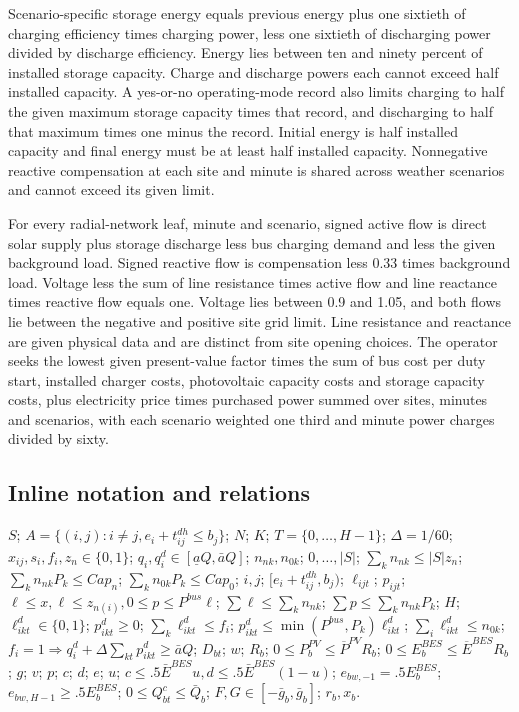 \documentclass[10pt]{article}
\begin{document}
Scenario-specific storage energy equals previous energy plus one sixtieth of charging efficiency times charging power, less one sixtieth of discharging power divided by discharge efficiency. Energy lies between ten and ninety percent of installed storage capacity. Charge and discharge powers each cannot exceed half installed capacity. A yes-or-no operating-mode record also limits charging to half the given maximum storage capacity times that record, and discharging to half that maximum times one minus the record. Initial energy is half installed capacity and final energy must be at least half installed capacity. Nonnegative reactive compensation at each site and minute is shared across weather scenarios and cannot exceed its given limit.

For every radial-network leaf, minute and scenario, signed active flow is direct solar supply plus storage discharge less bus charging demand and less the given background load. Signed reactive flow is compensation less 0.33 times background load. Voltage less the sum of line resistance times active flow and line reactance times reactive flow equals one. Voltage lies between 0.9 and 1.05, and both flows lie between the negative and positive site grid limit. Line resistance and reactance are given physical data and are distinct from site opening choices. The operator seeks the lowest given present-value factor times the sum of bus cost per duty start, installed charger costs, photovoltaic capacity costs and storage capacity costs, plus electricity price times purchased power summed over sites, minutes and scenarios, with each scenario weighted one third and minute power charges divided by sixty.

\subsection*{Inline notation and relations}
$S$; $A=\{(i,j):i\ne j,e_i+t^{dh}_{ij}\le b_j\}$; $N$; $K$; $T=\{0,\ldots,H-1\}$; $\Delta=1/60$; $x_{ij},s_i,f_i,z_n\in\{0,1\}$; $q_i,q^d_i\in[\underline a Q,\bar a Q]$; $n_{nk},n_{0k}$; $0,\ldots,|S|$; $\sum_kn_{nk}\le|S|z_n$; $\sum_kn_{nk}P_k\le Cap_n$; $\sum_kn_{0k}P_k\le Cap_0$; $i,j$; $[e_i+t^{dh}_{ij},b_j)$; $\ell_{ijt}$; $p_{ijt}$; $\ell\le x,\ell\le z_{n(i)},0\le p\le P^{bus}\ell$; $\sum\ell\le\sum_kn_{nk}$; $\sum p\le\sum_kn_{nk}P_k$; $H$; $\ell^d_{ikt}\in\{0,1\}$; $p^d_{ikt}\ge0$; $\sum_k\ell^d_{ikt}\le f_i$; $p^d_{ikt}\le\min(P^{bus},P_k)\ell^d_{ikt}$; $\sum_i\ell^d_{ikt}\le n_{0k}$; $f_i=1\Rightarrow q_i^d+\Delta\sum_{kt}p^d_{ikt}\ge\bar aQ$; $D_{bt}$; $w$; $R_b$; $0\le P_b^{PV}\le\overline P^{PV}R_b$; $0\le E_b^{BES}\le\overline E^{BES}R_b$; $g$; $v$; $p$; $c$; $d$; $e$; $u$; $c\le.5\bar E^{BES}u,d\le.5\bar E^{BES}(1-u)$; $e_{bw,-1}=.5E_b^{BES}$; $e_{bw,H-1}\ge.5E_b^{BES}$; $0\le Q^c_{bt}\le\bar Q_b$; $F,G\in[-\bar g_b,\bar g_b]$; $r_b,x_b$.
\end{document}
